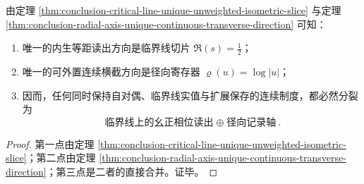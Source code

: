 \begin{corollary}[相位--径向二轴的范畴刚性]\label{cor:conclusion-phase-radial-two-axis-categorical-rigidity}
由定理 \ref{thm:conclusion-critical-line-unique-unweighted-isometric-slice} 与定理 \ref{thm:conclusion-radial-axis-unique-continuous-transverse-direction} 可知：
\begin{enumerate}
  \item 唯一的内生等距读出方向是临界线切片 \(\Re(s)=\frac12\)；
  \item 唯一的可外置连续横截方向是径向寄存器 \(\varrho(u)=\log|u|\)；
  \item 因而，任何同时保持自对偶、临界线实值与扩展保存的连续制度，都必然分裂为
  \[
  \boxed{
  \text{临界线上的幺正相位读出}
  \;\oplus\;
  \text{径向记录轴}
  }.
  \]
\end{enumerate}
\end{corollary}
\begin{proof}
第一点由定理 \ref{thm:conclusion-critical-line-unique-unweighted-isometric-slice}；第二点由定理 \ref{thm:conclusion-radial-axis-unique-continuous-transverse-direction}；第三点是二者的直接合并。证毕。
\end{proof}

